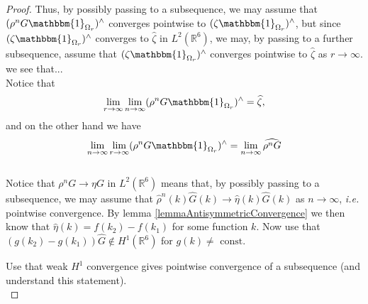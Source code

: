 \documentclass[a4paper,11pt]{article}
\newcommand*\diff{\mathop{}\!\mathrm{d}}
\newcommand{\ie}{\emph{i.e.} }
\newcommand{\R}{\mathbb{R}}
\numberwithin{equation}{section}
\begin{document}
\begin{proof}
		Thus, by possibly passing to a subsequence, we may assume that $ (\rho^nG\mathbbm{1}_{\Omega_r})^\wedge $ converges pointwise to $ (\zeta\mathbbm{1}_{\Omega_r})^\wedge $, but since $ (\zeta\mathbbm{1}_{\Omega_r})^\wedge $ converges to $ \hat{\zeta} $ in $ L^2(\R^6) $, we may, by passing to a further subsequence, assume that $ (\zeta\mathbbm{1}_{\Omega_r})^\wedge $ converges pointwise to $ \hat{\zeta} $ as $ r\to\infty $. we see that...
		\\
		Notice that \begin{equation}
		\lim\limits_{r\to\infty}\lim\limits_{n\to\infty}(\rho^nG\mathbbm{1}_{\Omega_r})^\wedge=\widehat{\zeta},
		\end{equation}
		and on the other hand we have \begin{equation}
		\lim\limits_{n\to\infty}\lim\limits_{r\to\infty}(\rho^nG\mathbbm{1}_{\Omega_r})^\wedge=\lim\limits_{n\to\infty}\widehat{\rho^nG}
		\end{equation}
		\\
		Notice that $ \rho^nG\to\eta G $ in $ L^2(\R^6) $ means that, by possibly passing to a subsequence, we may assume that $ \hat{\rho}^n(k)\hat{G}(k) \to \hat{\eta}(k)\hat{G}(k)$ as $ n\to\infty $, \ie pointwise convergence. By lemma \ref{lemmaAntisymmetricConvergence} we then know that $ \hat{\eta}(k)=f(k_2)-f(k_1) $ for some function $ k $.
		Now use that $ (g(k_2)-g(k_1))\hat{G}\notin H^1(\R^6) $ for $ g(k)\neq\text{ const.} $
		
		Use that weak $ H^1 $ convergence gives pointwise convergence of a subsequence (and understand this statement).
		\\
%		
	\end{proof}
\end{document}
